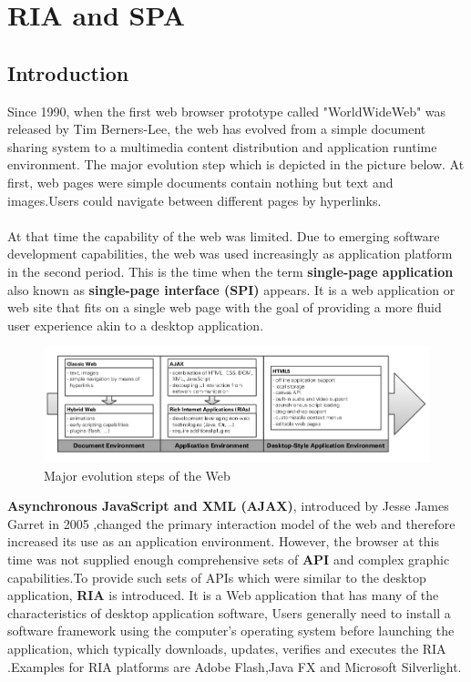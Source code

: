 \documentclass[14pt,a4paper]{extreport}
\begin{document}
	\section{RIA and SPA }
		\subsection{Introduction}
	

	
		Since 1990, when the first web browser prototype called "WorldWideWeb"\cite{BL12} was released by Tim Berners-Lee, the web has evolved from a simple document sharing system to a multimedia content distribution and application runtime environment. The major evolution step which is depicted in the picture below. At first, web pages were simple documents contain nothing but text and images.Users could navigate between different pages by hyperlinks.\\\\
		
		 At that time the capability of the web was limited. Due to emerging software development capabilities, the web was used increasingly as application platform in the second period. This is the time when the term \textbf{single-page application} also known as \textbf{single-page interface (SPI)} appears. It is a web application or web site that fits on a single web page with the goal of providing a more fluid user experience akin to a desktop application.
		 
		\begin{figure}[ht]
		 \begin{center}
			\includegraphics[scale=0.5]{WebEvolve.png}
			\caption{Major evolution steps of the Web\cite{TM11}}
		\end{center}
		\end{figure}
		\textbf{Asynchronous JavaScript and XML (AJAX)}, introduced by Jesse James Garret in 2005\cite{Gar05} ,changed the primary interaction model of the web and therefore increased its use as an application environment. However, the browser at this time was not supplied enough comprehensive sets of \textbf{API} and complex graphic capabilities.To provide such sets of APIs which were similar to the desktop application, \textbf{RIA} is introduced. It is a Web application that has many of the characteristics of desktop application software, Users generally need to install a software framework using the computer's operating system before launching the application, which typically downloads, updates, verifies and executes the RIA\cite{RIA} .Examples for RIA platforms are Adobe Flash,Java FX and Microsoft Silverlight.
		
\end{document}
